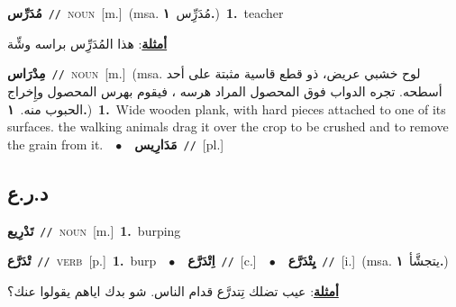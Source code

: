 \documentclass[10pt,a4paper,twoside]{article} %
\begin{document}
\begin{multicols}{2}
{\setlength\topsep{0pt}\textbf{\foreignlanguage{arabic}{مُدَرِّس}}\ {\color{gray}\texttt{//}\color{black}}\ \textsc{noun}\ [m.]\ \color{gray}(msa. \foreignlanguage{arabic}{مُدَرِِّس}~\foreignlanguage{arabic}{\textbf{١.}})\color{black}\ \textbf{1.}~teacher\  \begin{flushright}\color{gray}\foreignlanguage{arabic}{\textbf{\underline{\foreignlanguage{arabic}{أمثلة}}}: هذا المُدَرِِّس براسه وشِّة}\end{flushright}\color{black}} \vspace{2mm}

{\setlength\topsep{0pt}\textbf{\foreignlanguage{arabic}{مِدْرَاس}}\ {\color{gray}\texttt{//}\color{black}}\ \textsc{noun}\ [m.]\ \color{gray}(msa. \foreignlanguage{arabic}{لوح خشبي عريض، ذو قطع قاسية مثبتة على أحد أسطحه. تجره الدواب فوق المحصول المراد هرسه ، فيقوم بهرس المحصول وإِخراج الحبوب منه.}~\foreignlanguage{arabic}{\textbf{١.}})\color{black}\ \textbf{1.}~Wide wooden plank, with hard pieces attached to one of its surfaces. the walking animals drag it over the crop to be crushed and to remove the grain from it.\ \ $\bullet$\ \ \setlength\topsep{0pt}\textbf{\foreignlanguage{arabic}{مَدَارِيس}}\ {\color{gray}\texttt{//}\color{black}}\ [pl.]\ } \vspace{2mm}

\vspace{-3mm}
\subsection*{\color{blue}\foreignlanguage{arabic}{د.ر.ع}\color{blue}{}} 

{\setlength\topsep{0pt}\textbf{\foreignlanguage{arabic}{تَدْرِيع}}\ {\color{gray}\texttt{//}\color{black}}\ \textsc{noun}\ [m.]\ \textbf{1.}~burping\ } \vspace{2mm}

{\setlength\topsep{0pt}\textbf{\foreignlanguage{arabic}{تْدَرَّع}}\ {\color{gray}\texttt{//}\color{black}}\ \textsc{verb}\ [p.]\ \textbf{1.}~burp\ \ $\bullet$\ \ \setlength\topsep{0pt}\textbf{\foreignlanguage{arabic}{اِتْدَرَّع}}\ {\color{gray}\texttt{//}\color{black}}\ [c.]\ \ $\bullet$\ \ \setlength\topsep{0pt}\textbf{\foreignlanguage{arabic}{يِتْدَرَّع}}\ {\color{gray}\texttt{//}\color{black}}\ [i.]\ \color{gray}(msa. \foreignlanguage{arabic}{يتجشَّأ}~\foreignlanguage{arabic}{\textbf{١.}})\color{black}\  \begin{flushright}\color{gray}\foreignlanguage{arabic}{\textbf{\underline{\foreignlanguage{arabic}{أمثلة}}}: عيب تضلك تِتدرَّع قدام الناس. شو بدك اياهم يقولوا عنك؟}\end{flushright}\color{black}} \vspace{2mm}


\end{multicols}
\end{document}
